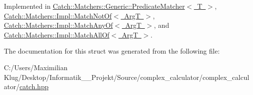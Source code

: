 Implemented in \mbox{\hyperlink{class_catch_1_1_matchers_1_1_generic_1_1_predicate_matcher_a2ec0e8ec19c4c5e26271d59a06a62b52}{Catch\+::\+Matchers\+::\+Generic\+::\+Predicate\+Matcher$<$ T $>$}}, \mbox{\hyperlink{struct_catch_1_1_matchers_1_1_impl_1_1_match_not_of_a181d693c0258e582d80dc6117a1f2b66}{Catch\+::\+Matchers\+::\+Impl\+::\+Match\+Not\+Of$<$ Arg\+T $>$}}, \mbox{\hyperlink{struct_catch_1_1_matchers_1_1_impl_1_1_match_any_of_a8a3e8338f979e56277dcf553efb78dc0}{Catch\+::\+Matchers\+::\+Impl\+::\+Match\+Any\+Of$<$ Arg\+T $>$}}, and \mbox{\hyperlink{struct_catch_1_1_matchers_1_1_impl_1_1_match_all_of_acfb377bda2c58ae62e6df9c3a8a89f8f}{Catch\+::\+Matchers\+::\+Impl\+::\+Match\+All\+Of$<$ Arg\+T $>$}}.



The documentation for this struct was generated from the following file\+:\begin{DoxyCompactItemize}
\item 
C\+:/\+Users/\+Maximilian Klug/\+Desktop/\+Informatik\+\_\+\_\+\+Projekt/\+Source/complex\+\_\+calculator/complex\+\_\+calculator/\mbox{\hyperlink{catch_8hpp}{catch.\+hpp}}\end{DoxyCompactItemize}

